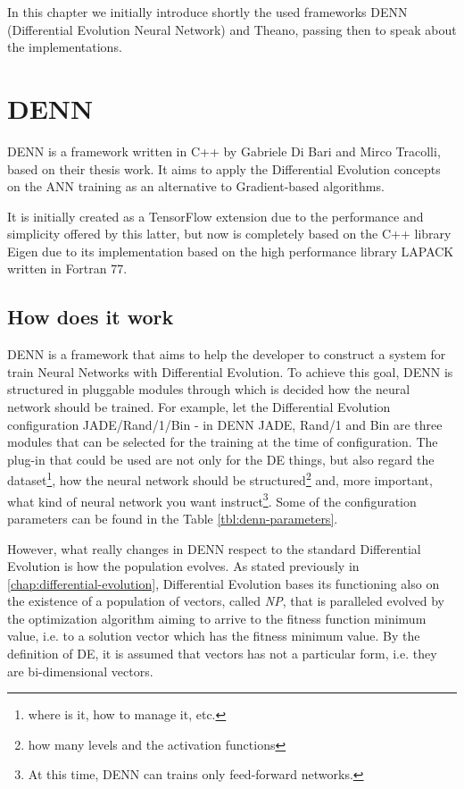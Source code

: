 In this chapter we initially introduce shortly the used frameworks DENN (Differential Evolution Neural Network) and Theano, passing then to speak about the implementations.

\section{DENN}\label{sec:DENN}
DENN is a framework written in C++ by Gabriele Di Bari and Mirco Tracolli, based on their thesis work. It aims to apply the Differential Evolution concepts on the ANN training as an alternative to Gradient-based algorithms. 

It is initially created as a TensorFlow extension due to the performance and simplicity offered by this latter, but now is completely based on the C++ library Eigen due to its implementation based on the high performance library LAPACK written in Fortran 77.

\subsection{How does it work}
DENN is a framework that aims to help the developer to construct a system for train Neural Networks with Differential Evolution. To achieve this goal, DENN is structured in pluggable modules through which is decided how the neural network should be trained. For example, let the Differential Evolution configuration JADE/Rand/1/Bin - in DENN JADE, Rand/1 and Bin are three modules that can be selected for the training at the time of configuration. The plug-in that could be used are not only for the DE things, but also regard the dataset\footnote{ where is it, how to manage it, etc.}, how the neural network should be structured\footnote{how many levels and the activation functions} and, more important, what kind of neural network you want instruct\footnote{At this time, DENN can trains only feed-forward networks.}. Some of the configuration parameters can be found in the Table \ref{tbl:denn-parameters}.

However, what really changes in DENN respect to the standard Differential Evolution is how the population evolves. As stated previously in \ref{chap:differential-evolution}, Differential Evolution bases its functioning also on the existence of a population of vectors, called \textit{NP}, that is paralleled evolved by the optimization algorithm aiming to arrive to the fitness function minimum value, i.e. to a solution vector which has the fitness minimum value. By the definition of DE, it is assumed that vectors has not a particular form, i.e. they are bi-dimensional vectors. 

